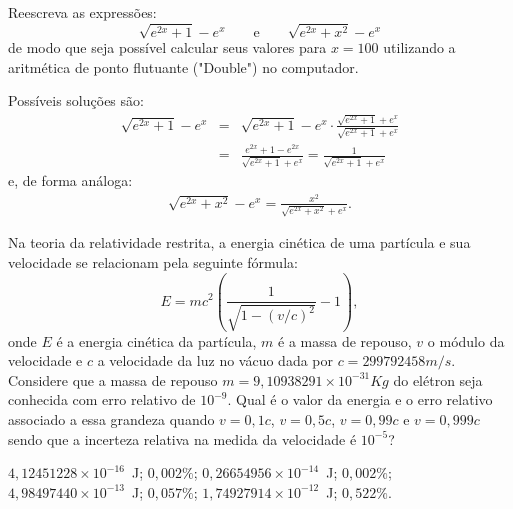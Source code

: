 

\begin{exer} Reescreva as expressões:
  \begin{equation} \sqrt{e^{2x}+1}-e^x \qquad\text{e}\qquad \sqrt{e^{2x}+x^2}-e^x  \end{equation}
  de modo que seja possível calcular seus valores para $x=100$ utilizando a aritmética de ponto flutuante ("Double") no computador.
\end{exer}
\begin{resp}
 Possíveis soluções são:
 \begin{eqnarray*}
  \sqrt{e^{2x}+1}-e^x &=& \sqrt{e^{2x}+1}-e^x \cdot \frac{\sqrt{e^{2x}+1}+e^x }{\sqrt{e^{2x}+1}+e^x }\\
&=&  \frac{e^{2x}+1-e^{2x} }{\sqrt{e^{2x}+1}+e^x }= \frac{1}{\sqrt{e^{2x}+1}+e^x }
 \end{eqnarray*}
e, de forma análoga:
 \begin{eqnarray*}
  \sqrt{e^{2x}+x^2}-e^x = \frac{x^2}{\sqrt{e^{2x}+x^2}+e^x}.
 \end{eqnarray*}
\end{resp}


\begin{exer} Na teoria da relatividade restrita, a energia cinética de uma partícula e sua velocidade se relacionam pela seguinte fórmula:
  \begin{equation}
    E=mc^2\left(\frac{1}{\sqrt{1-(v/c)^2}}-1\right),
  \end{equation}
onde $E$ é a energia cinética da partícula, $m$ é a massa de repouso, $v$ o módulo da velocidade e $c$ a velocidade da luz no vácuo dada por $c=299792458 m/s$. Considere que a massa de repouso $m=9,10938291\times 10^{-31} Kg$ do elétron seja conhecida com erro relativo de $10^{-9}$. Qual é o valor da energia e o erro relativo associado a essa grandeza quando $v=0,1 c$, $v=0,5 c$, $v=0,99c$ e $v=0,999c$ sendo que a incerteza relativa na medida da velocidade é $10^{-5}$?
\end{exer}
\begin{resp}
    $4,12451228\times 10^{-16}$~J; $0,002\%$; $0,26654956\times 10^{-14}$~J; $0,002\%$; $4,98497440\times 10^{-13}$~J; $0,057\%$; $1,74927914\times 10^{-12}$~J; $0,522\%$.
\end{resp}

%
